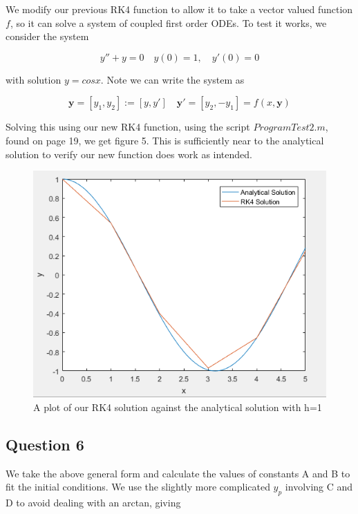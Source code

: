 \documentclass[10pt,a4paper]{report}
\begin{document}
We modify our previous RK4 function to allow it to take a vector valued function $f$, so it can solve a system of coupled first order ODEs. To test it works, we consider the system

\begin{equation*}
y''+y=0 \quad y(0)=1, \quad y'(0)=0
\end{equation*}

with solution $y=cosx$. Note we can write the system as 

\begin{equation*}
\bm{y}=[y_1, y_2]:=[y, y'] \quad \bm{y}'=[y_2,-y_1]=f(x,\bm{y})
\end{equation*}

Solving this using our new RK4 function, using the script $ProgramTest2.m$, found on page 19, we get figure 5. This is sufficiently near to the analytical solution to verify our new function does work as intended.

\begin{figure}[H]
\centering
\includegraphics[scale=0.8]{test2}
\caption{A plot of our RK4 solution against the analytical solution with h=1}
\end{figure}

\subsection*{Question 6}

We take the above general form and calculate the values of constants A and B to fit the initial conditions. We use the slightly more complicated $y_p$ involving C and D to avoid dealing with an arctan, giving
\end{document}
